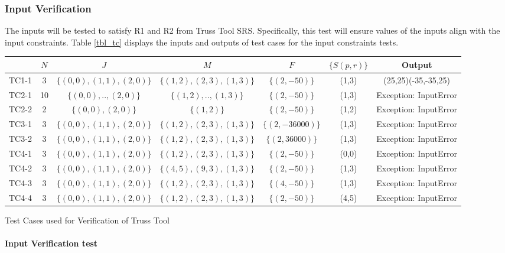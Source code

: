 \documentclass[12pt, titlepage]{article}
\begin{document}
\subsubsection{Input Verification}
The inputs will be tested to satisfy R1 and R2 from Truss Tool SRS. Specifically, this test will ensure values of the inputs align with the input constraints. Table \ref{tbl_tc} displays the inputs and outputs of test cases for the input constraints tests.
\begin{center}
 \begin{tabular}{|c|c c c c c| c |} 
 \hline
 &$N$&$J$&$M$&$F$&$\{S(p,r)\}$& \textbf{Output}\\ 
 \hline
 TC1-1 & 3& $\{(0,0),(1,1),(2,0)\}$ & $\{(1,2),(2,3),(1,3)\}$ &$\{(2,-50)\}$ & (1,3) & (25,25)(-35,-35,25) \\ 
 \hline
 TC2-1 & 10 & $\{(0,0),..,(2,0)\}$ & $\{(1,2),..,(1,3)\}$ &$\{(2,-50)\}$ & (1,3) & Exception: InputError \\ 
 \hline
  TC2-2 & 2 & $\{(0,0),(2,0)\}$ & $\{(1,2)\}$ &$\{(2,-50)\}$ & (1,2) & Exception: InputError \\ 
 \hline
 TC3-1 & 3& $\{(0,0),(1,1),(2,0)\}$ & $\{(1,2),(2,3),(1,3)\}$ &$\{(2,-36000)\}$ & (1,3) & Exception: InputError \\ 
 \hline
  TC3-2 & 3& $\{(0,0),(1,1),(2,0)\}$ & $\{(1,2),(2,3),(1,3)\}$ &$\{(2,36000)\}$ & (1,3) & Exception: InputError \\ 
 \hline
  TC4-1 & 3& $\{(0,0),(1,1),(2,0)\}$ & $\{(1,2),(2,3),(1,3)\}$ &$\{(2,-50)\}$ & (0,0) & Exception: InputError \\ 
 \hline
 TC4-2 & 3& $\{(0,0),(1,1),(2,0)\}$ & $\{(4,5),(9,3),(1,3)\}$ &$\{(2,-50)\}$ & (1,3) & Exception: InputError \\ 
 \hline
 TC4-3 & 3& $\{(0,0),(1,1),(2,0)\}$ & $\{(1,2),(2,3),(1,3)\}$ &$\{(4,-50)\}$ & (1,3) & Exception: InputError \\ 
 \hline
 TC4-4 & 3& $\{(0,0),(1,1),(2,0)\}$ & $\{(1,2),(2,3),(1,3)\}$ &$\{(2,-50)\}$ & (4,5) & Exception: InputError \\ 
 \hline
 
 
\end{tabular}
\caption{Test Cases used for Verification of Truss Tool}
\label{tbl_tc}

\end{center}		
\paragraph{Input Verification test}
\end{document}
